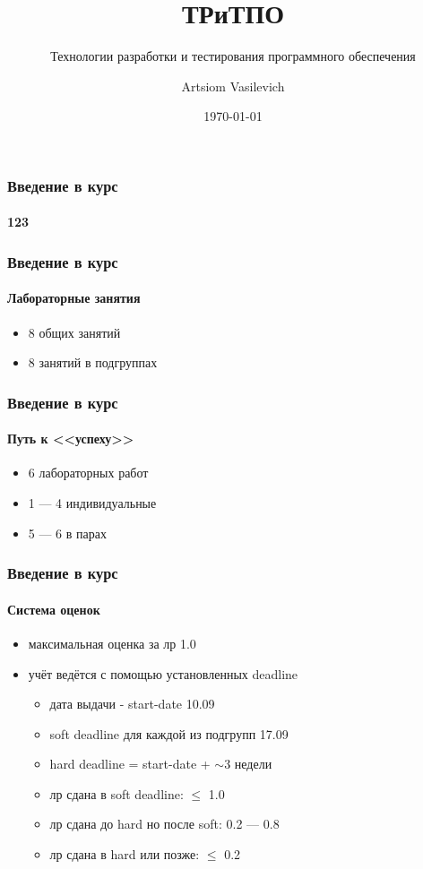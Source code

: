 \documentclass[aspectratio=169, 12pt]{beamer}
\title{ТРиТПО}
\subtitle{Технологии разработки и тестирования программного обеспечения}
\author{Artsiom Vasilevich}
\institute[BSUIR]{Belarusian State University of Informatics and Radioelectronics}
\date{\tiny \today}
\begin{document}
\frame{\titlepage}

\begin{frame}
    \frametitle{Введение в курс}
    \framesubtitle{123}

\end{frame}

\begin{frame}
    \frametitle{Введение в курс}
    \framesubtitle{Лабораторные занятия}
    \begin{itemize}
        \item 8 общих занятий
        \item 8 занятий в подгруппах
    \end{itemize}
\end{frame}

\begin{frame}
    \frametitle{Введение в курс}
    \framesubtitle{Путь к <<успеху>>}
    \begin{itemize}
        \item 6 лабораторных работ
        \item 1 --- 4 индивидуальные
        \item 5 --- 6 в парах
    \end{itemize}
\end{frame}

\begin{frame}
    \frametitle{Введение в курс}
    \framesubtitle{Система оценок}
    \begin{itemize}
        \item максимальная оценка за лр 1.0 \pause
        \item учёт ведётся с помощью установленных deadline \pause
        \begin{itemize}
            \item дата выдачи - start-date 10.09 \pause
            \item soft deadline для каждой из подгрупп 17.09 \pause
            \item hard deadline = start-date + $\sim$3 недели \pause
            \item лр сдана в soft deadline: $\leq$ 1.0
            \item лр сдана до hard но после soft: 0.2 --- 0.8
            \item лр сдана в hard или позже: $\leq$ 0.2
        \end{itemize}
    \end{itemize}
\end{frame}
\end{document}

